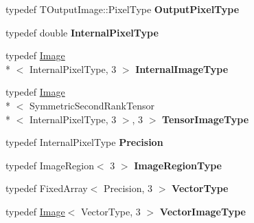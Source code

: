 \begin{DoxyCompactItemize}
\item 
\hypertarget{classitk_1_1_v_e_d_multigrid_image_filter_a0ca4057a987d16d007b8ba81777a0478}{typedef T\-Output\-Image\-::\-Pixel\-Type {\bfseries Output\-Pixel\-Type}}\label{classitk_1_1_v_e_d_multigrid_image_filter_a0ca4057a987d16d007b8ba81777a0478}

\item 
\hypertarget{classitk_1_1_v_e_d_multigrid_image_filter_afc4a041c3cb9883fbdff62fbeaf397b8}{typedef double {\bfseries Internal\-Pixel\-Type}}\label{classitk_1_1_v_e_d_multigrid_image_filter_afc4a041c3cb9883fbdff62fbeaf397b8}

\item 
\hypertarget{classitk_1_1_v_e_d_multigrid_image_filter_a9af7293ad6affb1fb33069e7fe4e58e0}{typedef \hyperlink{class_image}{Image}\\*
$<$ Internal\-Pixel\-Type, 3 $>$ {\bfseries Internal\-Image\-Type}}\label{classitk_1_1_v_e_d_multigrid_image_filter_a9af7293ad6affb1fb33069e7fe4e58e0}

\item 
\hypertarget{classitk_1_1_v_e_d_multigrid_image_filter_a63b34df60b6eeb9d1e9a0c7702d689b8}{typedef \hyperlink{class_image}{Image}\\*
$<$ Symmetric\-Second\-Rank\-Tensor\\*
$<$ Internal\-Pixel\-Type, 3 $>$, 3 $>$ {\bfseries Tensor\-Image\-Type}}\label{classitk_1_1_v_e_d_multigrid_image_filter_a63b34df60b6eeb9d1e9a0c7702d689b8}

\item 
\hypertarget{classitk_1_1_v_e_d_multigrid_image_filter_a63a3fe60f6b4bf4485e3474ef54a03d2}{typedef Internal\-Pixel\-Type {\bfseries Precision}}\label{classitk_1_1_v_e_d_multigrid_image_filter_a63a3fe60f6b4bf4485e3474ef54a03d2}

\item 
\hypertarget{classitk_1_1_v_e_d_multigrid_image_filter_a7832aaee343deb63ab4ca732964ef453}{typedef Image\-Region$<$ 3 $>$ {\bfseries Image\-Region\-Type}}\label{classitk_1_1_v_e_d_multigrid_image_filter_a7832aaee343deb63ab4ca732964ef453}

\item 
\hypertarget{classitk_1_1_v_e_d_multigrid_image_filter_a299326786f185c91052a6fc2e1725d67}{typedef Fixed\-Array$<$ Precision, 3 $>$ {\bfseries Vector\-Type}}\label{classitk_1_1_v_e_d_multigrid_image_filter_a299326786f185c91052a6fc2e1725d67}

\item 
\hypertarget{classitk_1_1_v_e_d_multigrid_image_filter_a2926b7cbac14c5aa3d0a6fcb810d2fb4}{typedef \hyperlink{class_image}{Image}$<$ Vector\-Type, 3 $>$ {\bfseries Vector\-Image\-Type}}\label{classitk_1_1_v_e_d_multigrid_image_filter_a2926b7cbac14c5aa3d0a6fcb810d2fb4}


\end{DoxyCompactItemize}
